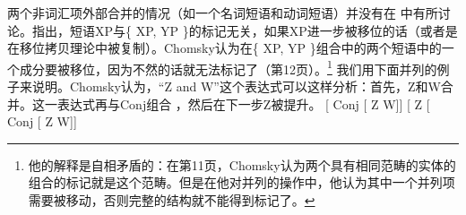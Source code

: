 两个非词汇项外部合并的情况（如一个名词短语和动词短语）并没有在 中有所讨论。\citet[--44]{Chomsky2013a}指出，短语XP与\{ XP, YP \}的标记无关，如果XP进一步被移位的话（或者是在移位拷贝理论中被复制）。Chomsky认为在\{ XP, YP \}组合中的两个短语中的一个成分要被移位，因为不然的话就无法标记了（第12页）。\footnote{\label{fn-labeling-gleiche-Kategorie}%
他的解释是自相矛盾的：在第11页，Chomsky认为两个具有相同范畴的实体的组合的标记就是这个范畴。但是在他对并列的操作中，他认为其中一个并列项需要被移动，否则完整的结构就不能得到标记了。
}
我们用下面并列的例子来说明。Chomsky认为，“Z  and W”这个表达式可以这样分析：首先，Z和W合并。这一表达式再与Conj组合 ，然后在下一步Z被提升。
\eal
\label{Chomsky-problems-of-projection-coordination}
\ex\label{ex-coord-a} {}[\sub{$\alpha$} Conj [\sub{$\beta$} Z W]]
\ex\label{ex-coord-b} {}[\sub{$\gamma$} Z [\sub{$\alpha$} Conj [\sub{$\beta$} Z W]]
\zl
